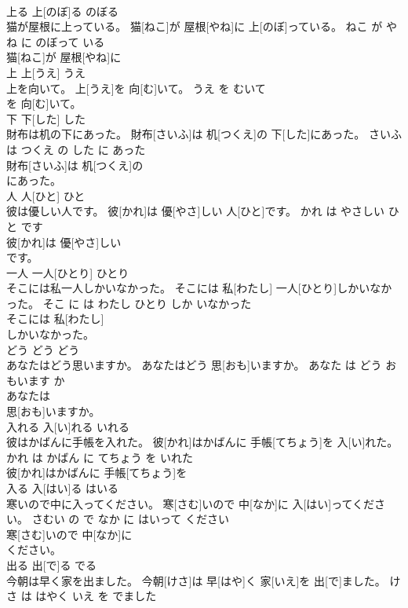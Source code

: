 \documentclass[8pt]{extreport}
\begin{document}
\begin{CJK}{UTF8}{min}
\\	上る	上[のぼ]る	のぼる	
\\	猫が屋根に上っている。	猫[ねこ]が 屋根[やね]に 上[のぼ]っている。	ねこ が やね に のぼって いる	
\\	猫[ねこ]が 屋根[やね]に
\\	上	上[うえ]	うえ	
\\	上を向いて。	上[うえ]を 向[む]いて。	うえ を むいて	
\\	を 向[む]いて。			
\\	下	下[した]	した	
\\	財布は机の下にあった。	財布[さいふ]は 机[つくえ]の 下[した]にあった。	さいふ は つくえ の した に あった	
\\	財布[さいふ]は 机[つくえ]の
\\	にあった。			
\\	人	人[ひと]	ひと	
\\	彼は優しい人です。	彼[かれ]は 優[やさ]しい 人[ひと]です。	かれ は やさしい ひと です	
\\	彼[かれ]は 優[やさ]しい
\\	です。			
\\	一人	一人[ひとり]	ひとり	
\\	そこには私一人しかいなかった。	そこには 私[わたし] 一人[ひとり]しかいなかった。	そこ に は わたし ひとり しか いなかった	
\\	そこには 私[わたし]
\\	しかいなかった。			
\\	どう	どう	どう	
\\	あなたはどう思いますか。	あなたはどう 思[おも]いますか。	あなた は どう おもいます か	
\\	あなたは
\\	思[おも]いますか。			
\\	入れる	入[い]れる	いれる	
\\	彼はかばんに手帳を入れた。	彼[かれ]はかばんに 手帳[てちょう]を 入[い]れた。	かれ は かばん に てちょう を いれた	
\\	彼[かれ]はかばんに 手帳[てちょう]を
\\	入る	入[はい]る	はいる	
\\	寒いので中に入ってください。	寒[さむ]いので 中[なか]に 入[はい]ってください。	さむい の で なか に はいって ください	
\\	寒[さむ]いので 中[なか]に
\\	ください。			
\\	出る	出[で]る	でる	
\\	今朝は早く家を出ました。	今朝[けさ]は 早[はや]く 家[いえ]を 出[で]ました。	けさ は はやく いえ を でました	

\end{CJK}
\end{document}
